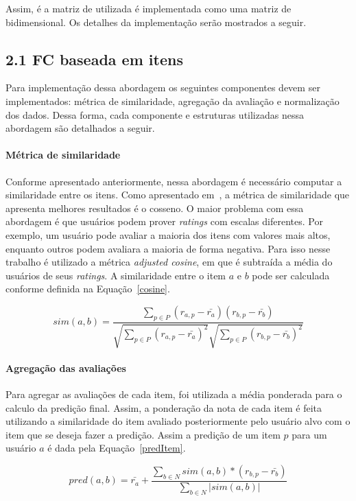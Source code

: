 \documentclass[brazil,a4paper,11pt]{article}
\begin{document}
Assim, é a matriz de utilizada é implementada como uma matriz de bidimensional. Os detalhes da implementação serão mostrados a seguir.


\subsection{2.1 FC baseada em itens}

Para implementação dessa abordagem os seguintes componentes devem ser implementados: métrica de similaridade, agregação da avaliação e normalização dos dados. Dessa forma, cada componente e estruturas utilizadas nessa abordagem são detalhados a seguir. 

\paragraph{Métrica de similaridade} Conforme apresentado anteriormente, nessa abordagem é necessário computar a similaridade entre os itens. Como apresentado em~\cite{Jannach2010}, a métrica de similaridade que apresenta melhores resultados é o cosseno. O maior problema com essa abordagem é que usuários podem prover \textit{ratings} com escalas diferentes. Por exemplo, um usuário pode avaliar a maioria dos itens com valores mais altos, enquanto outros podem avaliara a maioria de forma negativa. Para isso nesse trabalho é utilizado a métrica \textit{adjusted cosine}, em que é subtraída a média do usuários de seus \textit{ratings}. A similaridade entre o item $a$ e $b$ pode ser calculada conforme definida na Equação~\ref{cosine}.

\begin{equation}
\label{cosine}
 sim(a,b) = \frac{\sum_{p \in P}(r_{a,p} - \bar{r_a})(r_{b,p} - \bar{r_b})}           {\sqrt{\sum_{p \in P}(r_{a,p} - \bar{r_a})^2} \sqrt{\sum_{p \in P}(r_{b,p} - \bar{r_b})^2}}
\end{equation}


\paragraph{Agregação das avaliações}  Para agregar as avaliações de cada item, foi utilizada a média ponderada para o calculo da predição final. Assim, a ponderação da nota de cada item é feita utilizando a similaridade do item avaliado posteriormente pelo usuário alvo com o item que se deseja fazer a predição. Assim a predição de um item $p$ para um usuário $a$ é dada pela Equação~\ref{predItem}.

\begin{equation}
\label{predItem}
pred(a,b) = \bar{r_a} + \frac{\sum_{b\in N} sim(a,b) * (r_{b,p} - \bar{r_b})}{\sum_{b \in N} |sim(a,b)|}
\end{equation}
\end{document}
